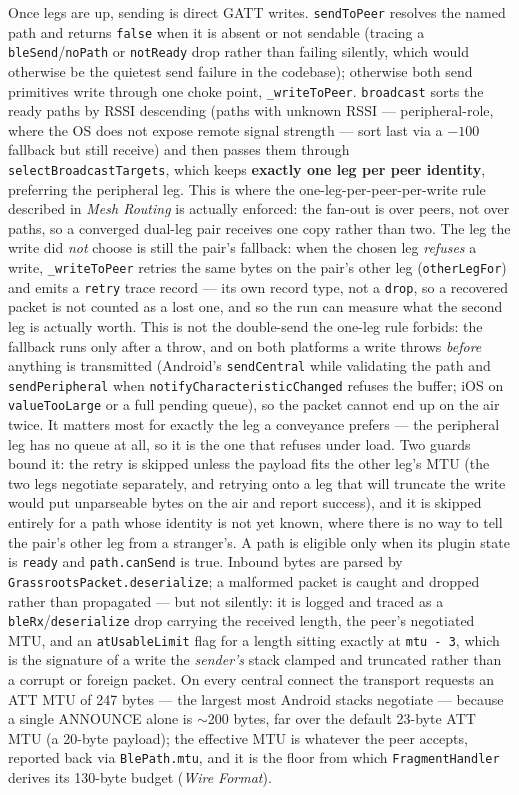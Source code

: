 \documentclass[11pt]{report}
\newcommand{\code}[1]{\texttt{\small #1}}
\begin{document}
Once legs are up, sending is direct GATT writes. \code{sendToPeer} resolves the named path and returns \code{false} when it is absent or not sendable (tracing a \code{bleSend}/\code{noPath} or \code{notReady} drop rather than failing silently, which would otherwise be the quietest send failure in the codebase); otherwise both send primitives write through one choke point, \code{\_writeToPeer}. \code{broadcast} sorts the ready paths by RSSI descending (paths with unknown RSSI --- peripheral-role, where the OS does not expose remote signal strength --- sort last via a $-100$ fallback but still receive) and then passes them through \code{selectBroadcastTargets}, which keeps \textbf{exactly one leg per peer identity}, preferring the peripheral leg. This is where the one-leg-per-peer-per-write rule described in \emph{Mesh Routing} is actually enforced: the fan-out is over peers, not over paths, so a converged dual-leg pair receives one copy rather than two. The leg the write did \emph{not} choose is still the pair's fallback: when the chosen leg \emph{refuses} a write, \code{\_writeToPeer} retries the same bytes on the pair's other leg (\code{otherLegFor}) and emits a \code{retry} trace record --- its own record type, not a \code{drop}, so a recovered packet is not counted as a lost one, and so the run can measure what the second leg is actually worth. This is not the double-send the one-leg rule forbids: the fallback runs only after a throw, and on both platforms a write throws \emph{before} anything is transmitted (Android's \code{sendCentral} while validating the path and \code{sendPeripheral} when \code{notifyCharacteristicChanged} refuses the buffer; iOS on \code{valueTooLarge} or a full pending queue), so the packet cannot end up on the air twice. It matters most for exactly the leg a conveyance prefers --- the peripheral leg has no queue at all, so it is the one that refuses under load. Two guards bound it: the retry is skipped unless the payload fits the other leg's MTU (the two legs negotiate separately, and retrying onto a leg that will truncate the write would put unparseable bytes on the air and report success), and it is skipped entirely for a path whose identity is not yet known, where there is no way to tell the pair's other leg from a stranger's. A path is eligible only when its plugin state is \code{ready} and \code{path.canSend} is true. Inbound bytes are parsed by \code{GrassrootsPacket.deserialize}; a malformed packet is caught and dropped rather than propagated --- but not silently: it is logged and traced as a \code{bleRx}/\code{deserialize} drop carrying the received length, the peer's negotiated MTU, and an \code{atUsableLimit} flag for a length sitting exactly at \code{mtu - 3}, which is the signature of a write the \emph{sender's} stack clamped and truncated rather than a corrupt or foreign packet. On every central connect the transport requests an ATT MTU of 247 bytes --- the largest most Android stacks negotiate --- because a single ANNOUNCE alone is $\sim$200 bytes, far over the default 23-byte ATT MTU (a 20-byte payload); the effective MTU is whatever the peer accepts, reported back via \code{BlePath.mtu}, and it is the floor from which \code{FragmentHandler} derives its 130-byte budget (\emph{Wire Format}).
\end{document}
